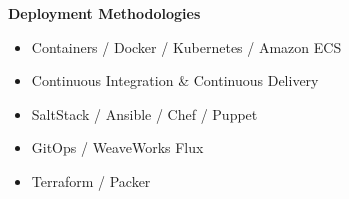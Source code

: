 \textbf{Deployment Methodologies}
    \begin{multicols}{2}
        \begin{itemize}
            \item Containers / Docker / Kubernetes / Amazon ECS
            \item Continuous Integration \& Continuous Delivery
            \item SaltStack / Ansible / Chef / Puppet
            \item GitOps / WeaveWorks Flux
            \item Terraform / Packer
        \end{itemize}
    \end{multicols}
